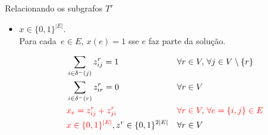 \documentclass[dvipsnames]{beamer}
\newcommand{\espacoXBinary}{\{0,1\}^{|E|}}
\newcommand{\espacoZBinary}{\{0,1\}^{2|E|}}
\begin{document}

\begin{frame}{Relacionando os subgrafos $T^{r}$}
  \begin{itemize}
  \item $x \in \espacoXBinary$. \\
    Para cada~$e \in E$, \hbox{$x(e) = 1$} sse $e$ faz parte da solução.

    \begin{align}
      &\sum_{i \in \delta^{-}(j)}z^{r}_{ij} = 1 && \forall r \in V,\,\forall j \in V \setminus \{r\} \nonumber\\
      &\sum_{i \in \delta^{-}(r)}z^{r}_{ir} = 0 && \forall r \in V\nonumber\\
      &\textcolor{red}{x_{e} = z^{r}_{ij} + z^{r}_{ji}} && \textcolor{red}{\forall r \in V,\, \forall e = \{i,j\} \in E}\\
      &\textcolor{red}{x \in \espacoXBinary}, z^{r} \in \espacoZBinary && \forall r \in V
    \end{align}
    
  \end{itemize}
\end{frame}
\end{document}
